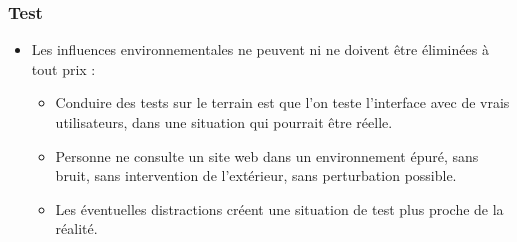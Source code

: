 		\begin{frame}[allowframebreaks]
		\frametitle{Test}
					\begin {itemize}
				      \item Les influences environnementales ne peuvent ni ne doivent être éliminées à tout prix :
						\begin {itemize}
						\item Conduire des tests sur le terrain est que l'on teste l'interface avec de vrais utilisateurs, dans une situation qui pourrait être réelle. 
						\item Personne ne consulte un site web dans un environnement épuré, sans bruit, sans intervention de l'extérieur, sans perturbation possible.
						\item Les éventuelles distractions créent une situation de test plus proche de la réalité.
						\end{itemize}


\end{itemize}
\end{frame}
